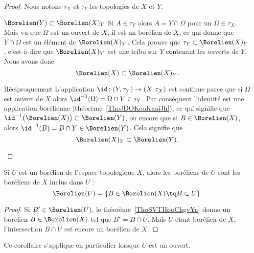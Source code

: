 \begin{proof}
    Nous notons \( \tau_X\) et \( \tau_Y\) les topologies de \( X\) et \( Y\).
    \begin{subproof}
        \item[\( \Borelien(Y)\subset\Borelien(X)_Y\)]
            Si \( A\in \tau_Y\) alors \( A=Y\cap \Omega\) pour un \( \Omega\in \tau_X\). Mais vu que \(\Omega\) est un ouvert de \( X\), il est un borélien de \( X\), ce qui donne que \( Y\cap\Omega\) est un élément de \( \Borelien(X)_Y\). Cela prouve que \( \tau_Y\subset\Borelien(X)_Y\), c'est-à-dire que \( \Borelien(X)_Y\) est une tribu sur \( Y\) contenant les ouverts de \( Y\). Nous avons donc
            \begin{equation}
                \Borelien(X)\subset\Borelien(X)_Y.
            \end{equation}
        \item[Réciproquement]
            L'application \( \id\colon (Y,\tau_Y)\to (X,\tau_X)\) est continue parce que si \( \Omega\) est ouvert de \( X\) alors \( \id^{-1}(\Omega)=\Omega\cap Y\in \tau_Y\). Par conséquent l'identité est une application borélienne (théorème~\ref{ThoJDOKooKaaiJh}), ce qui signifie que \( \id^{-1}\big( \Borelien(X) \big)\subset\Borelien(Y)\), ou encore que si \( B\in\Borelien(X)\), alors \( \id^{-1}(B)=B\cap Y\in\Borelien(Y)\). Cela signifie que
            \begin{equation}
                \Borelien(X)_Y\subset \Borelien(Y).
            \end{equation}
    \end{subproof}
\end{proof}

\begin{corollary}       \label{CorooMJQYooFfwoTd}
    Si \( U\) est un borélien de l'espace topologique \( X\), alors les boréliens de \( U\) sont les boréliens de \( X\) inclus dans \( U\) :
    \begin{equation}
        \Borelien(U)=\{ B\in\Borelien(X)\tq B\subset U \}.
    \end{equation}
\end{corollary}

\begin{proof}
    Si \( B'\in\Borelien(U)\), le théorème~\ref{ThoSVTHooChgvYa} donne un borélien \( B\in\Borelien(X)\) tel que \( B'=B\cap U\). Mais \( U\) étant borélien de \( X\), l'intersection \( B\cap U\) est encore un borélien de \( X\).
\end{proof}
Ce corollaire s'applique en particulier lorsque \( U\) est un ouvert.

